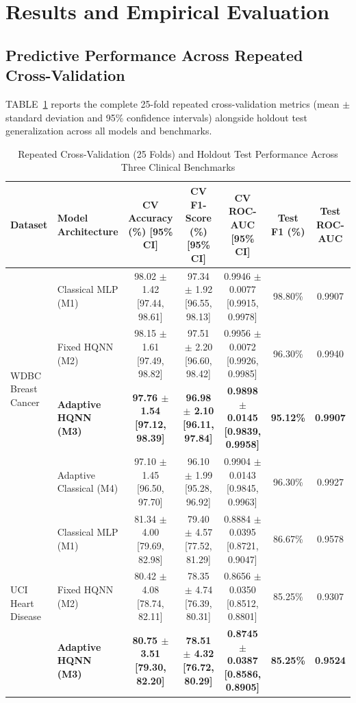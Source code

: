 \documentclass[conference]{IEEEtran}
\begin{document}
\section{Results and Empirical Evaluation}

\subsection{Predictive Performance Across Repeated Cross-Validation}
TABLE~\ref{tab:performance} reports the complete 25-fold repeated cross-validation metrics (mean $\pm$ standard deviation and 95\% confidence intervals) alongside holdout test generalization across all models and benchmarks.

\begin{table}[htbp]
\caption{Repeated Cross-Validation (25 Folds) and Holdout Test Performance Across Three Clinical Benchmarks}
\label{tab:performance}
\centering
\begin{tabular}{llccccc}
\toprule
Dataset & Model Architecture & CV Accuracy (\%) [95\% CI] & CV F1-Score (\%) [95\% CI] & CV ROC-AUC [95\% CI] & Test F1 (\%) & Test ROC-AUC \\
\midrule
\multirow{4}{*}{WDBC Breast Cancer} 
& Classical MLP (M1) & 98.02 $\pm$ 1.42 [97.44, 98.61] & 97.34 $\pm$ 1.92 [96.55, 98.13] & 0.9946 $\pm$ 0.0077 [0.9915, 0.9978] & 98.80\% & 0.9907 \\
& Fixed HQNN (M2) & 98.15 $\pm$ 1.61 [97.49, 98.82] & 97.51 $\pm$ 2.20 [96.60, 98.42] & 0.9956 $\pm$ 0.0072 [0.9926, 0.9985] & 96.30\% & 0.9940 \\
& \textbf{Adaptive HQNN (M3)} & \textbf{97.76 $\pm$ 1.54 [97.12, 98.39]} & \textbf{96.98 $\pm$ 2.10 [96.11, 97.84]} & \textbf{0.9898 $\pm$ 0.0145 [0.9839, 0.9958]} & \textbf{95.12\%} & \textbf{0.9907} \\
& Adaptive Classical (M4) & 97.10 $\pm$ 1.45 [96.50, 97.70] & 96.10 $\pm$ 1.99 [95.28, 96.92] & 0.9904 $\pm$ 0.0143 [0.9845, 0.9963] & 96.30\% & 0.9927 \\
\midrule
\multirow{4}{*}{UCI Heart Disease} 
& Classical MLP (M1) & 81.34 $\pm$ 4.00 [79.69, 82.98] & 79.40 $\pm$ 4.57 [77.52, 81.29] & 0.8884 $\pm$ 0.0395 [0.8721, 0.9047] & 86.67\% & 0.9578 \\
& Fixed HQNN (M2) & 80.42 $\pm$ 4.08 [78.74, 82.11] & 78.35 $\pm$ 4.74 [76.39, 80.31] & 0.8656 $\pm$ 0.0350 [0.8512, 0.8801] & 85.25\% & 0.9307 \\
& \textbf{Adaptive HQNN (M3)} & \textbf{80.75 $\pm$ 3.51 [79.30, 82.20]} & \textbf{78.51 $\pm$ 4.32 [76.72, 80.29]} & \textbf{0.8745 $\pm$ 0.0387 [0.8586, 0.8905]} & \textbf{85.25\%} & \textbf{0.9524} \\

\end{tabular}
\end{table}
\end{document}
